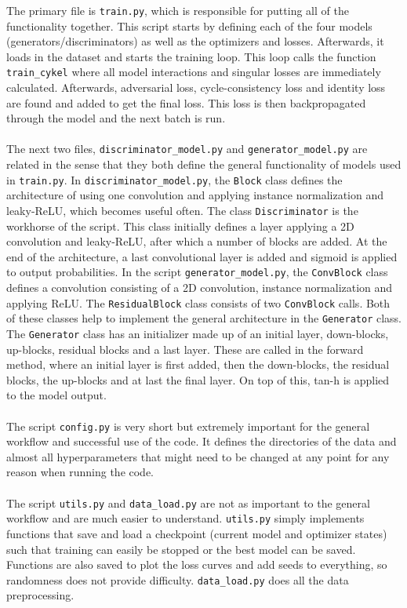 \documentclass[11pt, fleqn, titlepage]{article}
\newcommand{\1}[1]{\mathds{1}\left[#1\right]}
\begin{document}
\noindent
The primary file is \texttt{train.py}, which is responsible for putting all of the functionality together. This script starts by defining each of the four models (generators/discriminators) as well as the optimizers and losses. Afterwards, it loads in the dataset and starts the training loop. This loop calls the function \texttt{train\_cykel} where all model interactions and singular losses are immediately calculated. Afterwards, adversarial loss, cycle-consistency loss and identity loss are found and added to get the final loss. This loss is then backpropagated through the model and the next batch is run.
\\\\
The next two files, \texttt{discriminator\_model.py} and \texttt{generator\_model.py} are related in the sense that they both define the general functionality of models used in \texttt{train.py}. In \texttt{discriminator\_model.py}, the \texttt{Block} class defines the architecture of using one convolution and applying instance normalization and leaky-ReLU, which becomes useful often. The class \texttt{Discriminator} is the workhorse of the script. This class initially defines a layer applying a 2D convolution and leaky-ReLU, after which a number of blocks are added. At the end of the architecture, a last convolutional layer is added and sigmoid is applied to output probabilities. In the script \texttt{generator\_model.py}, the \texttt{ConvBlock} class defines a convolution consisting of a 2D convolution, instance normalization and applying ReLU. The \texttt{ResidualBlock} class consists of two \texttt{ConvBlock} calls. Both of these classes help to implement the general architecture in the \texttt{Generator} class. The \texttt{Generator} class has an initializer made up of an initial layer, down-blocks, up-blocks, residual blocks and a last layer. These are called in the forward method, where an initial layer is first added, then the down-blocks, the residual blocks, the up-blocks and at last the final layer. On top of this, tan-h is applied to the model output.
\\\\
The script \texttt{config.py} is very short but extremely important for the general workflow and successful use of the code. It defines the directories of the data and almost all hyperparameters that might need to be changed at any point for any reason when running the code.
\\\\
The script \texttt{utils.py} and \texttt{data\_load.py} are not as important to the general workflow and are much easier to understand. \texttt{utils.py} simply implements functions that save and load a checkpoint (current model and optimizer states) such that training can easily be stopped or the best model can be saved. Functions are also saved to plot the loss curves and add seeds to everything, so randomness does not provide difficulty. \texttt{data\_load.py} does all the data preprocessing.
\end{document}
